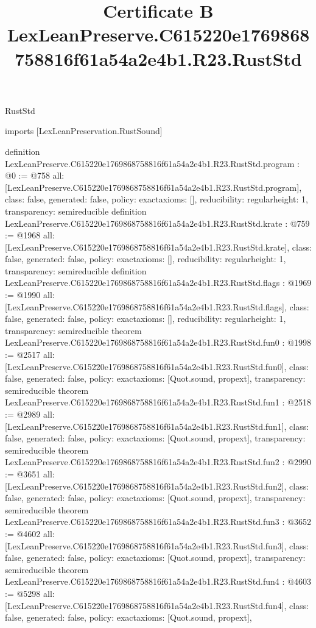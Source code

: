 \begin{lexlean}{RustStd}
\title{Certificate B LexLeanPreserve.C615220e1769868758816f61a54a2e4b1.R23.RustStd}
\begin{coremodule}
imports [LexLeanPreservation.RustSound]

definition LexLeanPreserve.C615220e1769868758816f61a54a2e4b1.R23.RustStd.program : @0 := @758 {
  all: [LexLeanPreserve.C615220e1769868758816f61a54a2e4b1.R23.RustStd.program],
  class: false,
  generated: false,
  policy: exact{axioms: []},
  reducibility: regular{height: 1},
  transparency: semireducible
}
definition LexLeanPreserve.C615220e1769868758816f61a54a2e4b1.R23.RustStd.krate : @759 := @1968 {
  all: [LexLeanPreserve.C615220e1769868758816f61a54a2e4b1.R23.RustStd.krate],
  class: false,
  generated: false,
  policy: exact{axioms: []},
  reducibility: regular{height: 1},
  transparency: semireducible
}
definition LexLeanPreserve.C615220e1769868758816f61a54a2e4b1.R23.RustStd.flags : @1969 := @1990 {
  all: [LexLeanPreserve.C615220e1769868758816f61a54a2e4b1.R23.RustStd.flags],
  class: false,
  generated: false,
  policy: exact{axioms: []},
  reducibility: regular{height: 1},
  transparency: semireducible
}
theorem LexLeanPreserve.C615220e1769868758816f61a54a2e4b1.R23.RustStd.fun0 : @1998 := @2517 {
  all: [LexLeanPreserve.C615220e1769868758816f61a54a2e4b1.R23.RustStd.fun0],
  class: false,
  generated: false,
  policy: exact{axioms: [Quot.sound, propext]},
  transparency: semireducible
}
theorem LexLeanPreserve.C615220e1769868758816f61a54a2e4b1.R23.RustStd.fun1 : @2518 := @2989 {
  all: [LexLeanPreserve.C615220e1769868758816f61a54a2e4b1.R23.RustStd.fun1],
  class: false,
  generated: false,
  policy: exact{axioms: [Quot.sound, propext]},
  transparency: semireducible
}
theorem LexLeanPreserve.C615220e1769868758816f61a54a2e4b1.R23.RustStd.fun2 : @2990 := @3651 {
  all: [LexLeanPreserve.C615220e1769868758816f61a54a2e4b1.R23.RustStd.fun2],
  class: false,
  generated: false,
  policy: exact{axioms: [Quot.sound, propext]},
  transparency: semireducible
}
theorem LexLeanPreserve.C615220e1769868758816f61a54a2e4b1.R23.RustStd.fun3 : @3652 := @4602 {
  all: [LexLeanPreserve.C615220e1769868758816f61a54a2e4b1.R23.RustStd.fun3],
  class: false,
  generated: false,
  policy: exact{axioms: [Quot.sound, propext]},
  transparency: semireducible
}
theorem LexLeanPreserve.C615220e1769868758816f61a54a2e4b1.R23.RustStd.fun4 : @4603 := @5298 {
  all: [LexLeanPreserve.C615220e1769868758816f61a54a2e4b1.R23.RustStd.fun4],
  class: false,
  generated: false,
  policy: exact{axioms: [Quot.sound, propext]},
}
\end{coremodule}
\end{lexlean}
